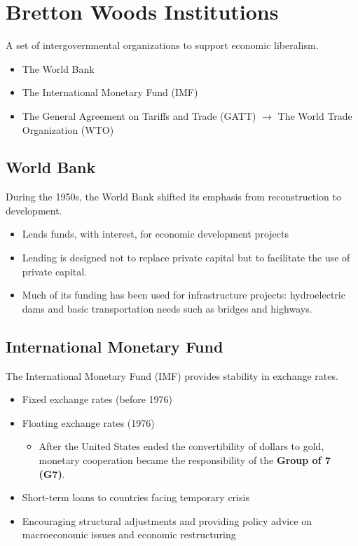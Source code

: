 \documentclass[
]{book}
\providecommand{\tightlist}{%
  \setlength{\itemsep}{0pt}\setlength{\parskip}{0pt}}
\begin{document}
\hypertarget{bretton-woods-institutions}{%
\section{Bretton Woods Institutions}\label{bretton-woods-institutions}}

A set of intergovernmental organizations to support economic liberalism.

\begin{itemize}
\item
  The World Bank
\item
  The International Monetary Fund (IMF)
\item
  The General Agreement on Tariffs and Trade (GATT) \(\rightarrow\) The World Trade Organization (WTO)
\end{itemize}

\hypertarget{world-bank}{%
\subsection{World Bank}\label{world-bank}}

During the 1950s, the World Bank shifted its emphasis from reconstruction to development.

\begin{itemize}
\item
  Lends funds, with interest, for economic development projects
\item
  Lending is designed not to replace private capital but to facilitate the use of private capital.
\item
  Much of its funding has been used for infrastructure projects: hydroelectric dams and basic transportation needs such as bridges and highways.
\end{itemize}

\hypertarget{international-monetary-fund}{%
\subsection{International Monetary Fund}\label{international-monetary-fund}}

The International Monetary Fund (IMF) provides stability in exchange rates.

\begin{itemize}
\item
  Fixed exchange rates (before 1976)
\item
  Floating exchange rates (1976)

  \begin{itemize}
  \tightlist
  \item
    After the United States ended the convertibility of dollars to gold, monetary cooperation became the responsibility of the \textbf{Group of 7 (G7)}.
  \end{itemize}
\item
  Short-term loans to countries facing temporary crisis
\item
  Encouraging structural adjustments and providing policy advice on macroeconomic issues and economic restructuring
\end{itemize}
\end{document}

